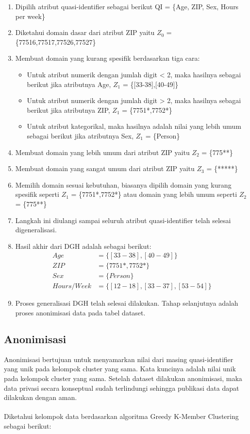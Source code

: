 \begin{enumerate}
\item Dipilih atribut quasi-identifier sebagai berikut QI = \{Age, ZIP, Sex, Hours per week\}
\item Diketahui domain dasar dari atribut ZIP yaitu $Z_0$ = \{77516,77517,77526,77527\}
\item Membuat domain yang kurang spesifik berdasarkan tiga cara:
\begin{itemize}
\item Untuk atribut numerik dengan jumlah digit < 2, maka hasilnya sebagai berikut jika atributnya Age, $Z_1$ = \{[33-38],[40-49]\} 
\item Untuk atribut numerik  dengan jumlah digit > 2, maka hasilnya sebagai berikut jika atributnya ZIP, $Z_1$ = \{7751*,7752*\}
\item Untuk atribut kategorikal, maka hasilnya adalah nilai yang lebih umum sebagai berikut jika atributnya Sex, $Z_1$ = \{Person\}
\end{itemize} 
\item Membuat domain yang lebih umum dari atribut ZIP yaitu $Z_2$ = \{775**\}
\item Membuat domain yang sangat umum dari atribut ZIP yaitu $Z_3$ = \{*****\}
\item Memilih domain sesuai kebutuhan, biasanya dipilih domain yang kurang spesifik seperti $Z_1$ = \{7751*,7752*\} atau domain yang lebih umum seperti $Z_2$ = \{775**\}
\item Langkah ini diulangi sampai seluruh atribut quasi-identifier telah selesai digeneralisasi.
\item Hasil akhir dari DGH adalah sebagai berikut: 
\begin{align*}
Age &= \{[33-38], [40-49]\}\\
ZIP &= \{7751*, 7752*\}\\
Sex &= \{Person\}\\
Hours/Week &=\{[12-18], [33-37], [53-54]\}
\end{align*} 
\item Proses generalisasi DGH telah selesai dilakukan. Tahap selanjutnya adalah proses anonimisasi data pada tabel dataset.
\end{enumerate}



\subsection{Anonimisasi}
Anonimisasi bertujuan untuk menyamarkan nilai dari masing quasi-identifier yang unik pada kelompok cluster yang sama. Kata kuncinya adalah nilai unik pada kelompok cluster yang sama. Setelah dataset dilakukan anonimisasi, maka data privasi secara konseptual sudah terlindungi sehingga publikasi data dapat dilakukan dengan aman.
\\\\
\noindent Diketahui kelompok data berdasarkan algoritma Greedy K-Member Clustering sebagai berikut: \\

